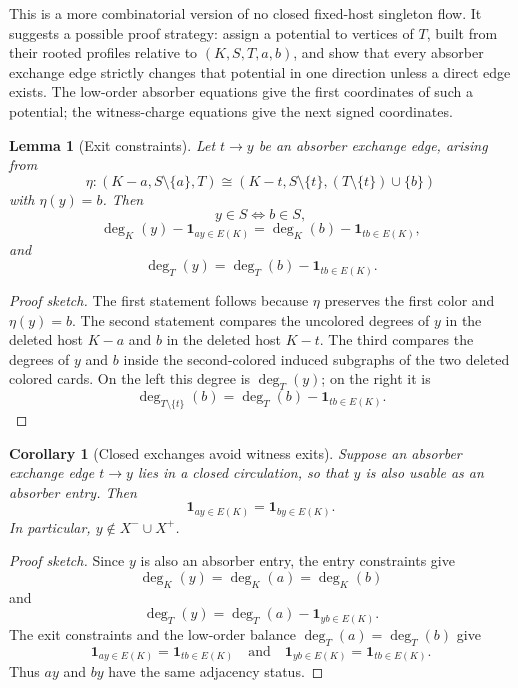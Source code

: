 \documentclass[11pt]{article}
\newtheorem{lemma}{Lemma}
\newtheorem{corollary}{Corollary}
\newcommand{\one}{\mathbf{1}}
\begin{document}
This is a more combinatorial version of no closed fixed-host singleton flow.
It suggests a possible proof strategy: assign a potential to vertices of
\(T\), built from their rooted profiles relative to \((K,S,T,a,b)\), and show
that every absorber exchange edge strictly changes that potential in one
direction unless a direct edge exists.  The low-order absorber equations give
the first coordinates of such a potential; the witness-charge equations give
the next signed coordinates.

\begin{lemma}[Exit constraints]
Let \(t\to y\) be an absorber exchange edge, arising from
\[
  \eta:
  (K-a,S\setminus\{a\},T)
  \cong
  (K-t,S\setminus\{t\},(T\setminus\{t\})\cup\{b\})
\]
with \(\eta(y)=b\).  Then
\[
  y\in S \Longleftrightarrow b\in S,
\]
\[
  \deg_K(y)-\one_{ay\in E(K)}
  =
  \deg_K(b)-\one_{tb\in E(K)},
\]
and
\[
  \deg_T(y)=\deg_T(b)-\one_{tb\in E(K)}.
\]
\end{lemma}

\begin{proof}[Proof sketch]
The first statement follows because \(\eta\) preserves the first color and
\(\eta(y)=b\).  The second statement compares the uncolored degrees of \(y\)
in the deleted host \(K-a\) and \(b\) in the deleted host \(K-t\).  The third
compares the degrees of \(y\) and \(b\) inside the second-colored induced
subgraphs of the two deleted colored cards.  On the left this degree is
\(\deg_T(y)\); on the right it is
\[
  \deg_{T\setminus\{t\}}(b)=\deg_T(b)-\one_{tb\in E(K)}.
\]
\end{proof}

\begin{corollary}[Closed exchanges avoid witness exits]
Suppose an absorber exchange edge \(t\to y\) lies in a closed circulation, so
that \(y\) is also usable as an absorber entry.  Then
\[
  \one_{ay\in E(K)}=\one_{by\in E(K)}.
\]
In particular, \(y\notin X^-\cup X^+\).
\end{corollary}

\begin{proof}[Proof sketch]
Since \(y\) is also an absorber entry, the entry constraints give
\[
  \deg_K(y)=\deg_K(a)=\deg_K(b)
\]
and
\[
  \deg_T(y)=\deg_T(a)-\one_{yb\in E(K)}.
\]
The exit constraints and the low-order balance
\(\deg_T(a)=\deg_T(b)\) give
\[
  \one_{ay\in E(K)}=\one_{tb\in E(K)}
  \quad\text{and}\quad
  \one_{yb\in E(K)}=\one_{tb\in E(K)}.
\]
Thus \(ay\) and \(by\) have the same adjacency status.
\end{proof}
\end{document}
